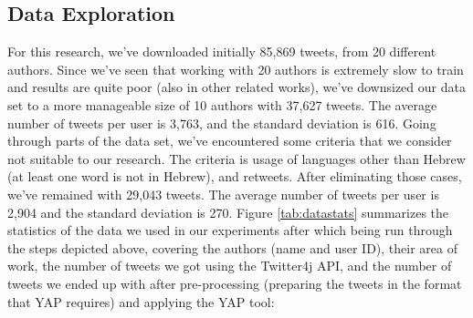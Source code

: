 \documentclass[a4paper]{article}
\begin{document}
\subsection{Data Exploration}

For this research, we've downloaded initially 85,869 tweets, from 20 different authors. Since we've seen that working with 20 authors is extremely slow to train and results are quite poor (also in other related works), we've downsized our data set to a more manageable size of 10 authors with 37,627 tweets.
The average number of tweets per user is 3,763, and the standard deviation is 616.
Going through parts of the data set, we've encountered some criteria that we consider not suitable to our research. The criteria is usage of languages other than Hebrew (at least one word is not in Hebrew), and retweets.
After eliminating those cases, we've remained with 29,043 tweets. The average number of tweets per user is 2,904 and the standard deviation is 270.
Figure \ref{tab:datastats} summarizes the statistics of the data we used in our experiments after which being run through the steps depicted above, covering the authors (name and user ID), their area of work, the number of tweets we got using the Twitter4j API, and the number of tweets we ended up with after pre-processing (preparing the tweets in the format that YAP requires) and applying the YAP tool:\\
\end{document}
